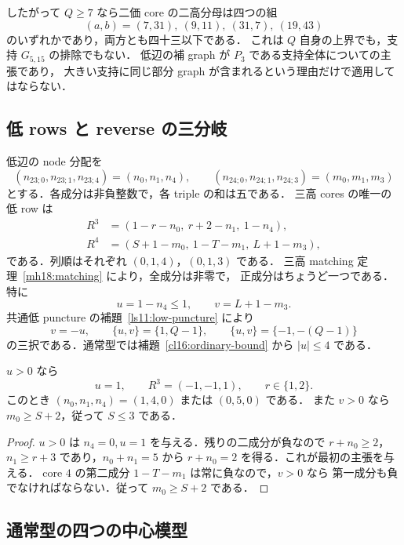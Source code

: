 したがって $Q\ge7$ なら二価 core の二高分母は四つの組
\[
 (a,b)=(7,31),\ (9,11),\ (31,7),\ (19,43)
\]
のいずれかであり，両方とも四十三以下である．
これは $Q$ 自身の上界でも，支持 $G_{5,15}$ の排除でもない．
低辺の補 graph が $P_3$ である支持全体についての主張であり，
大きい支持に同じ部分 graph が含まれるという理由だけで適用してはならない．

\subsection{低 rows と reverse の三分岐}

低辺の node 分配を
\[
 (n_{23;0},n_{23;1},n_{23;4})=(n_0,n_1,n_4),\qquad
 (n_{24;0},n_{24;1},n_{24;3})=(m_0,m_1,m_3)
\]
とする．各成分は非負整数で，各 triple の和は五である．
三高 cores の唯一の低 row は
\begin{equation}\label{g51521:low-rows}
 \begin{split}
 R^3&=(1-r-n_0,\ r+2-n_1,\ 1-n_4),\\
 R^4&=(S+1-m_0,\ 1-T-m_1,\ L+1-m_3),
 \end{split}
\end{equation}
である．列順はそれぞれ $(0,1,4)$，$(0,1,3)$ である．
三高 matching 定理~\ref{mh18:matching} により，全成分は非零で，
正成分はちょうど一つである．特に
\[
 u=1-n_4\le1,\qquad v=L+1-m_3.
\]
共通低 puncture の補題~\ref{ls11:low-puncture} により
\begin{equation}\label{g51521:three-branches}
 v=-u,\qquad \{u,v\}=\{1,Q-1\},\qquad
 \{u,v\}=\{-1,-(Q-1)\}
\end{equation}
の三択である．通常型では補題~\ref{cl16:ordinary-bound} から $|u|\le4$ である．

\begin{lemma}\label{g51521:positive-reverse}
$u>0$ なら
\[
 u=1,\qquad R^3=(-1,-1,1),\qquad r\in\{1,2\}.
\]
このとき $(n_0,n_1,n_4)=(1,4,0)$ または $(0,5,0)$ である．
また $v>0$ なら $m_0\ge S+2$，従って $S\le3$ である．
\end{lemma}
\begin{proof}
$u>0$ は $n_4=0,u=1$ を与える．残りの二成分が負なので
$r+n_0\ge2$，$n_1\ge r+3$ であり，$n_0+n_1=5$ から
$r+n_0=2$ を得る．これが最初の主張を与える．
core $4$ の第二成分 $1-T-m_1$ は常に負なので，$v>0$ なら
第一成分も負でなければならない．従って $m_0\ge S+2$ である．
\end{proof}

\subsection{通常型の四つの中心模型}

